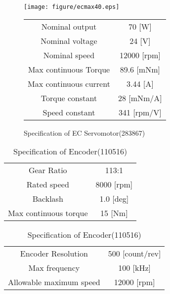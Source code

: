 \documentclass[a4paper,12pt]{article_vdlab_sotsuron}
\begin{document}
\vspace*{10mm}
\begin{figure}[htp]
  \begin{minipage}{0.4\textwidth}
    \begin{center}
      \texttt{[image: figure/ecmax40.eps]}
      \vspace*{3mm}
      \caption{ECmax40 283867}
      \label{fig:ecmax40}
    \end{center}
  \end{minipage}
  \begin{minipage}{0.6\textwidth}
      \begin{center}
	\makeatletter
	\def\@captype{table}
	\makeatother
	\caption{Specification of EC Servomotor(283867)}
	\label{tab:ecmax40}
	  \begin{tabular}{cc}\hline
	    Nominal output & 70 [W] \\
	    Nominal voltage & 24 [V] \\
	    Nominal speed & 12000 [rpm] \\
	    Max continuous Torque & 89.6 [mNm] \\
	    Max continuous current & 3.44 [A] \\
	    Torque constant & 28 [mNm/A] \\
	    Speed constant & 341 [rpm/V] \\\hline
	  \end{tabular}
	\end{center}
  \end{minipage}
\end{figure}

\vspace*{10mm}
\begin{table}[htp]
  \begin{minipage}{0.5\textwidth}
    \begin{center}
      \makeatletter
	\def\@captype{table}
	\makeatother
	\caption{Specification Gearhead(203126)}
	\label{tab:113:1}
	  \begin{tabular}{cc}\hline
	    Gear Ratio & 113:1 \\
	    Rated speed & 8000 [rpm] \\
	    Backlash & 1.0 [deg] \\
	    Max continuous torque & 15 [Nm] \\\hline
	  \end{tabular}
    \end{center}
  \end{minipage}
  \begin{minipage}{0.5\textwidth}
      \begin{center}
	\makeatletter
	\def\@captype{table}
	\makeatother
	\caption{Specification of Encoder(110516)}
	\label{tab:500pulse}
	  \begin{tabular}{cc}\hline
	    Encoder Resolution & 500 [count/rev] \\
	    Max frequency & 100 [kHz] \\
	    Allowable maximum speed & 12000 [rpm] \\\hline
	  \end{tabular}
	\end{center}
  \end{minipage}
\end{table}
\newpage
\end{document}
